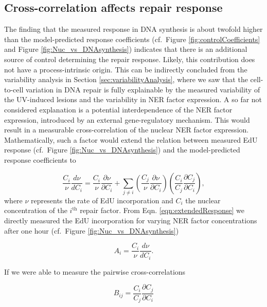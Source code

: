 \subsection{Cross-correlation affects repair response}
\label{sec:crossCorelResponse}
The finding that the measured response in DNA synthesis is about twofold higher than the model-predicted response coefficients (cf.\ Figure \ref{fig:controlCoefficients} and Figure \ref{fig:Nuc_vs_DNAsynthesis}) indicates that there is an additional source of control determining the repair response. Likely, this contribution does not have a process-intrinsic origin. This can be indirectly concluded from the variability analysis in Section \ref{sec:variabilityAnalysis}, where we saw that the cell-to-cell variation in DNA repair is fully explainable by the measured variability of the UV-induced lesions and the variability in NER factor expression. A so far not considered explanation is a potential interdependence of the NER factor expression, introduced by an external gene-regulatory mechanism.  
This would result in a measurable cross-correlation of the nuclear NER factor expression. Mathematically, such a factor would extend the relation between measured EdU response (cf.\ Figure \ref{fig:Nuc_vs_DNAsynthesis}) and the model-predicted response coefficients to 

\begin{equation}
\frac{C_i}{\nu}\frac{d \nu}{d C_i} = \frac{C_i}{\nu}\frac{\partial \nu}{\partial C_i} + \sum_{j \neq i} \left( \frac{C_j}{\nu}\frac{\partial \nu}{\partial C_i}\right) \left(\frac{C_i}{C_j}\frac{\partial C_j}{\partial C_i}\right), 
\label{eqn:extendedResponse}
\end{equation}    
where $\nu$ represents the rate of EdU incorporation and $C_i$ the nuclear concentration of the $i^{\text{th}}$ repair factor. From Eqn. \ref{eqn:extendedResponse} we directly measured the EdU incorporation for varying NER factor concentrations after one hour (cf.\ Figure \ref{fig:Nuc_vs_DNAsynthesis})

\begin{equation}
A_i = \frac{C_i}{\nu}\frac{d \nu}{d C_i}. \nonumber
\end{equation}

If we were able to measure the pairwise cross-correlations

\begin{equation}
B_{ij} = \frac{C_i}{C_j}\frac{\partial C_j}{\partial C_i} \nonumber
\end{equation}

